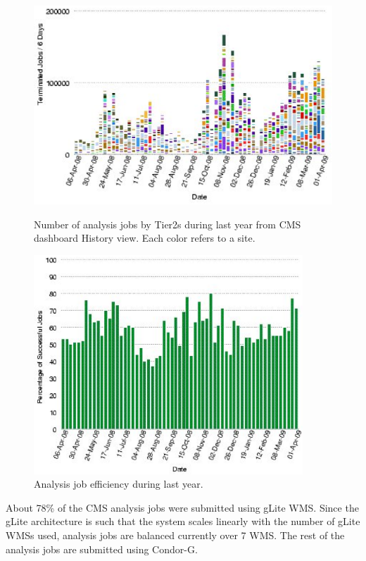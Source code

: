 \begin{figure}
\begin{minipage}{.55\textwidth}
\centering
\includegraphics[width=1.0\textwidth]{AnalysisJobHistoryApril0809.eps}
\caption{Number of analysis jobs by Tier2s during last year from CMS dashboard History view. Each color refers to a site. }
\label{fig:AnalysisJobHistoryApril0809}
\end{minipage}
\begin{minipage}{.45\textwidth}
\centering
\includegraphics[width=0.9\textwidth]{T2EffApril0809.eps}
\caption{Analysis job efficiency during last year. }
\label{fig:T2EffApril0809}
\end{minipage}
\end{figure}

About 78\% of the CMS analysis jobs were submitted using gLite WMS.  Since the gLite architecture is such that the system scales linearly with the number of gLite WMSs used, analysis jobs are balanced currently over 7 WMS. The rest of the analysis jobs are submitted using Condor-G.

